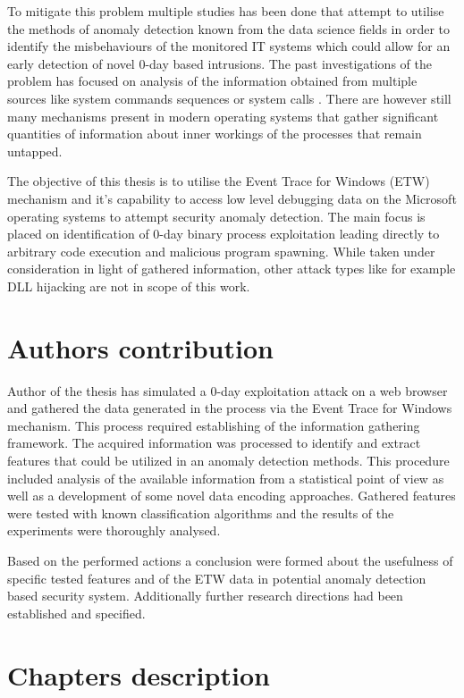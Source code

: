 \documentclass[a4paper,twoside,12pt]{book}
\begin{document}
To mitigate this problem multiple studies has been done that attempt to utilise the methods of
anomaly detection known from the data science fields in order to identify the misbehaviours of 
the monitored IT systems which could allow for an early detection of novel 0-day based intrusions.
The past investigations of the problem has focused on analysis of the information obtained from 
multiple sources like system commands sequences \cite{bib:lane1997application} or system calls 
\cite{bib:rsvm}. There are however still many mechanisms present in modern operating systems 
that gather significant quantities of information about inner workings of the processes that remain
untapped. 

The objective of this thesis is to utilise the Event Trace for Windows (ETW) mechanism and it's 
capability to access low level debugging data on the Microsoft operating systems to attempt
security anomaly detection. The main focus is placed on identification of 0-day binary process 
exploitation leading directly to arbitrary code execution and malicious program spawning. While 
taken under consideration in light of gathered information, other attack types like for example 
DLL hijacking are not in scope of this work.

\section{Authors contribution}

Author of the thesis has simulated a 0-day exploitation attack on a web browser and gathered 
the data generated in the process via the Event Trace for Windows mechanism. This process 
required establishing of the information gathering framework. The acquired 
information was processed to identify and extract features that could be utilized in an anomaly detection
methods. This procedure included analysis of the available information from a statistical point of view
as well as a development of some novel data encoding approaches. Gathered 
features were tested with known classification algorithms and the results of the experiments were thoroughly analysed.

Based on the performed actions a conclusion were formed about the usefulness of specific tested features 
and of the ETW data
in potential anomaly detection based security system. Additionally further research directions
had been established and specified.

\section{Chapters description}
\end{document}
